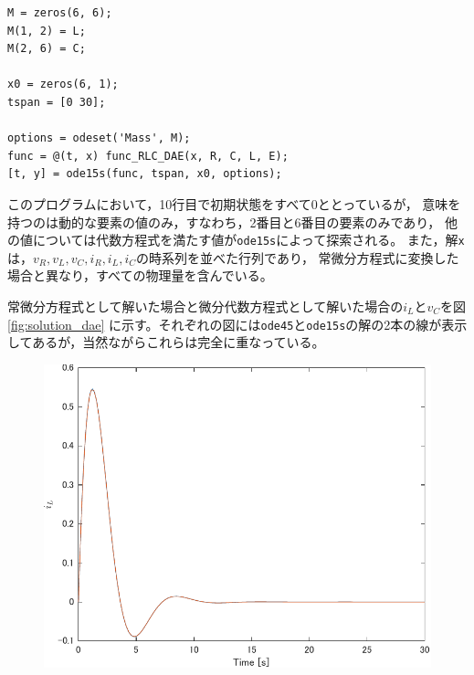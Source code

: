 {\begin{例}[簡単な例題]
\begin{PROGRAMA}[count,title={main\_RLC\_DAE.m}]
\begin{verbatim}
M = zeros(6, 6);
M(1, 2) = L;
M(2, 6) = C;

x0 = zeros(6, 1);
tspan = [0 30];

options = odeset('Mass', M);
func = @(t, x) func_RLC_DAE(x, R, C, L, E);
[t, y] = ode15s(func, tspan, x0, options); 
\end{verbatim}
\end{PROGRAMA}
このプログラムにおいて，10行目で初期状態をすべて0ととっているが，
意味を持つのは動的な要素の値のみ，すなわち，2番目と6番目の要素のみであり，
他の値については代数方程式を満たす値が\verb|ode15s|によって探索される。
また，解\verb|x|は，$v_R, v_L, v_C, i_R, i_L, i_C$の時系列を並べた行列であり，
常微分方程式に変換した場合と異なり，すべての物理量を含んでいる。

常微分方程式として解いた場合と微分代数方程式として解いた場合の$i_L$と$v_C$を図\ref{fig:solution_dae}
に示す。それぞれの図には\verb|ode45|と\verb|ode15s|の解の2本の線が表示してあるが，当然ながらこれらは完全に重なっている。
\begin{figure}[t]
  \centering
  {
    \begin{minipage}{0.49\linewidth}
      \centering
      \includegraphics[width = 1.0\linewidth]{figs/i_L}
    \end{minipage}
    \begin{minipage}{0.49\linewidth}
      \centering

\end{minipage}}
\end{figure}
\end{例}}
